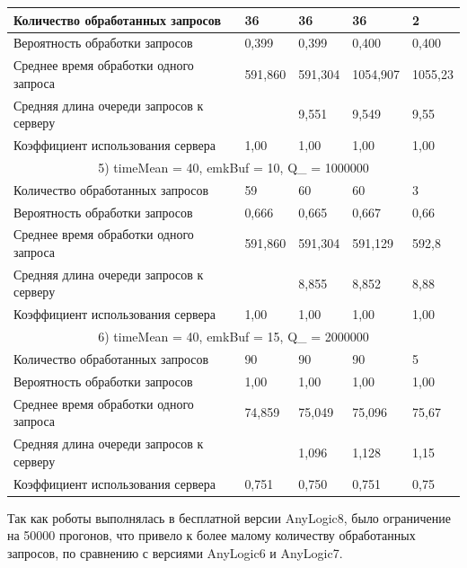 \begin{longtable} {
	|p{}
	|p{}
	|p{}
	|p{}
	|p{}
	|}
	Количество обработанных запросов & 36 & 36 & 36 & 2 \\ \hline
	Вероятность обработки запросов & 0,399 & 0,399 & 0,400 & 0,400 \\ \hline
	Среднее время обработки одного запроса & 591,860 & 591,304
		& 1054,907 & 1055,23 \\ \hline
	Средняя длина очереди запросов к серверу & & 9,551 & 9,549 & 9,55 \\ \hline
	Коэффициент использования сервера & 1,00 & 1,00 & 1,00 & 1,00 \\ \hline
	\multicolumn{5}{|c|}{5) timeMean = 40, emkBuf = 10, Q\_ = 1000000}\\ \hline
	Количество обработанных запросов & 59 & 60 & 60 & 3 \\ \hline
	Вероятность обработки запросов & 0,666 & 0,665 & 0,667 & 0,66 \\ \hline
	Среднее время обработки одного запроса & 591,860 & 591,304
		& 591,129 & 592,8 \\ \hline
	Средняя длина очереди запросов к серверу & & 8,855 & 8,852 & 8,88 \\ \hline
	Коэффициент использования сервера & 1,00 & 1,00 & 1,00 & 1,00 \\ \hline
	\multicolumn{5}{|c|}{6) timeMean = 40, emkBuf = 15, Q\_ = 2000000}\\ \hline
	Количество обработанных запросов & 90 & 90 & 90 & 5 \\ \hline
	Вероятность обработки запросов & 1,00 & 1,00 & 1,00 & 1,00 \\ \hline
	Среднее время обработки одного запроса & 74,859 & 75,049
		& 75,096 & 75,67 \\ \hline
	Средняя длина очереди запросов к серверу & & 1,096 & 1,128 & 1,15 \\ \hline
	Коэффициент использования сервера & 0,751 & 0,750 & 0,751 & 0,75 \\ \hline
\end{longtable}

Так как роботы выполнялась в бесплатной версии AnyLogic8, было ограничение на
50000 прогонов, что привело к более малому количеству  обработанных запросов,
по сравнению с версиями AnyLogic6 и AnyLogic7.


